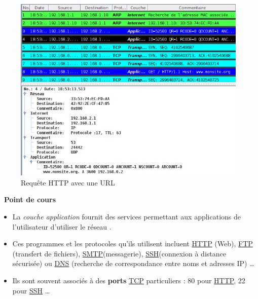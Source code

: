 \documentclass[
  11pt,
]{article}
\providecommand{\tightlist}{%
  \setlength{\itemsep}{0pt}\setlength{\parskip}{0pt}}
\newcounter{cours}
\newenvironment{cours}[1]
{\par \medskip   \addtocounter{cours}{1} \noindent  
\begin{bclogo}[arrondi =0.1,  ombre = true, barre=none, logo=\bcbook, marge=4]{~\textbf{Point de cours} \textbf{\thecours} {\itshape #1} }  \par}
{
\end{bclogo}
 \par \bigskip }
\newcounter{prog}
\begin{document}
\begin{figure}
\centering
\includegraphics{images/filius-dns4.png}
\caption{Requête HTTP avec une URL}
\end{figure}

\begin{cours}{}

\begin{itemize}
\tightlist
\item
  La \emph{couche application} fournit des services permettant aux
  applications de l'utilisateur d'utiliser le réseau .
\item
  Ces programmes et les protocoles qu'ils utilisent incluent
  \href{https://fr.wikipedia.org/wiki/Hypertext_Transfer_Protocol}{HTTP}
  (Web),
  \href{https://fr.wikipedia.org/wiki/File_Transfer_Protocol}{FTP}
  (transfert de fichiers),
  \href{https://fr.wikipedia.org/wiki/Simple_Mail_Transfer_Protocol}{SMTP}(messagerie),
  \href{https://fr.wikipedia.org/wiki/Secure_Shell}{SSH}(connexion à
  distance sécurisée) ou
  \href{https://fr.wikipedia.org/wiki/Domain_Name_System}{DNS}
  (recherche de correspondance entre noms et adresses IP) \ldots{}
\item
  Ils sont souvent associés à des \textbf{ports}
  \href{https://fr.wikipedia.org/wiki/Transmission_Control_Protocol}{TCP}
  particuliers : 80 pour
  \href{https://fr.wikipedia.org/wiki/Hypertext_Transfer_Protocol}{HTTP},
  22 pour \href{https://fr.wikipedia.org/wiki/Secure_Shell}{SSH}
  \ldots{}
\end{itemize}

\end{cours}
\end{document}

